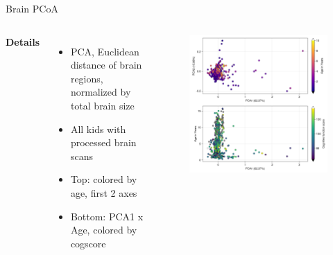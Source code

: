 
\begin{frame}{Brain PCoA}
    \begin{columns}[c] %

        \textbf{Details}
        \begin{itemize}
            \item PCA, Euclidean distance of brain regions, normalized by total brain size
            \item All kids with processed brain scans
            \item Top: colored by age, first 2 axes
            \item Bottom: PCA1 x Age, colored by cogscore
            
        \end{itemize}

    
        \begin{figure}
        \includegraphics[width=1\linewidth]{../figures/brain_pcoa.png}
        \end{figure}

    \end{columns}
\end{frame}

